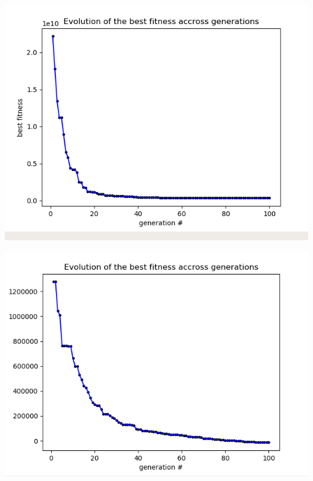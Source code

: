 \documentclass[12pt]{article}
\begin{document}
				\begin{minipage}{0.6\linewidth}
					\includegraphics[width=\linewidth]{3.png}
				\end{minipage}
				\hfill
				\begin{minipage}{0.6\linewidth}
					\includegraphics[width=\linewidth]{4.png}
				\end{minipage}
\end{document}
